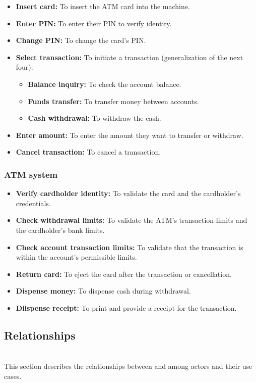 \begin{itemize}
\item
\textbf{Insert card:} To insert the ATM card into the machine.
\item
\textbf{Enter PIN:} To enter their PIN to verify identity.
\item
\textbf{Change PIN:} To change the card's PIN.
\item
\textbf{Select transaction:} To initiate a transaction (generalization of the next four):

\begin{itemize}
\item
\textbf{Balance inquiry:} To check the account balance.
\item
\textbf{Funds transfer:} To transfer money between accounts.
\item
\textbf{Cash withdrawal:} To withdraw the cash.
\end{itemize}
\item
\textbf{Enter amount:} To enter the amount they want to transfer or withdraw.
\item
\textbf{Cancel transaction:} To cancel a transaction.
\end{itemize}

\subsubsection{ATM system}\label{vrrcj-1XBKwB3M635KTmS}

\begin{itemize}
\item
\textbf{Verify cardholder identity:} To validate the card and the cardholder's credentials.
\item
\textbf{Check withdrawal limits:} To validate the ATM's transaction limits and the cardholder's bank limits.
\item
\textbf{Check account transaction limits:} To validate that the transaction is within the account's permissible limits.
\item
\textbf{Return card:} To eject the card after the transaction or cancellation.
\item
\textbf{Dispense money:} To dispense cash during withdrawal.
\item
\textbf{Diispense receipt:} To print and provide a receipt for the transaction.
\end{itemize}

\subsection{Relationships}\label{sNsTucwzYvKTF86L2rNsn}
\\
This section describes the relationships between and among actors and their use cases.

